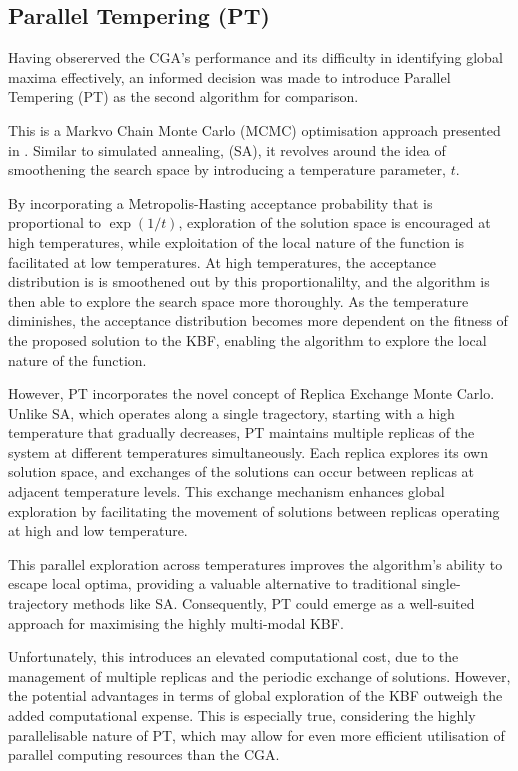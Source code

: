 \documentclass[10pt]{article}
\begin{document}
\begin{multicols}{2}

\section{Parallel Tempering (PT)}
\label{sec:PT}

Having obsererved the CGA's performance and its difficulty in identifying global maxima effectively, an informed decision was made to introduce Parallel Tempering (PT) as the second algorithm for comparison.

This is a Markvo Chain Monte Carlo (MCMC) optimisation approach presented in \cite{Earl_2005}. Similar to simulated annealing, (SA), it revolves around the idea of smoothening the search space by introducing a temperature parameter, $t$. 

By incorporating a Metropolis-Hasting acceptance probability that is proportional to $\exp(1/t)$, exploration of the solution space is encouraged at high temperatures, while exploitation of the local nature of the function is facilitated at low temperatures. At high temperatures, the acceptance distribution is is smoothened out by this proportionalilty, and the algorithm is then able to explore the search space more thoroughly. As the temperature diminishes, the acceptance distribution becomes more dependent on the fitness of the proposed solution to the KBF, enabling the algorithm to explore the local nature of the function.

However, PT incorporates the novel concept of Replica Exchange Monte Carlo. Unlike SA, which operates along a single tragectory, starting with a high temperature that gradually decreases, PT maintains multiple replicas of the system at different temperatures simultaneously. Each replica explores its own solution space, and exchanges of the solutions can occur between replicas at adjacent temperature levels. This exchange mechanism enhances global exploration by facilitating the movement of solutions between replicas operating at high and low temperature. 

This parallel exploration across temperatures improves the algorithm's ability to escape local optima, providing a valuable alternative to traditional single-trajectory methods like SA. Consequently, PT could emerge as a well-suited approach for maximising the highly multi-modal KBF.

Unfortunately, this introduces an elevated computational cost, due to the management of multiple replicas and the periodic exchange of solutions. However, the potential advantages in terms of global exploration of the KBF outweigh the added computational expense. This is especially true, considering the highly parallelisable nature of PT, which may allow for even more efficient utilisation of parallel computing resources than the CGA. 


\end{multicols}
\end{document}
